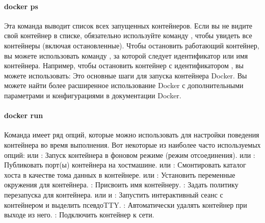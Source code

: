 \documentclass[letterpaper,10pt,russian]{sphinxmanual}
\begin{document}
\paragraph{docker ps}
\label{\detokenize{educational_materials/docker_base/content:docker-ps}}
\sphinxAtStartPar
Эта команда выводит список всех запущенных контейнеров. Если вы не видите свой контейнер в списке, обязательно используйте команду , чтобы увидеть все контейнеры (включая остановленные). Чтобы остановить работающий контейнер, вы можете использовать команду , за которой следует идентификатор или имя контейнера.
Например, чтобы остановить контейнер с идентификатором , вы можете использовать:
Это основные шаги для запуска контейнера Docker. Вы можете найти более расширенное использование Docker с дополнительными параметрами и конфигурациями в документации Docker.


\paragraph{docker run}
\label{\detokenize{educational_materials/docker_base/content:docker-run}}
\sphinxAtStartPar
Команда  имеет ряд опций, которые можно использовать для настройки поведения контейнера во время выполнения. Вот некоторые из наиболее часто используемых
опций:
 или : Запуск контейнера в фоновом режиме (режим отсоединения).
 или : Публиковать порт(ы) контейнера на хост\sphinxhyphen{}машине.
 или : Смонтировать каталог хоста в качестве тома данных в контейнере.
 или : Установить переменные окружения для контейнера.
: Присвоить имя контейнеру.
: Задать политику перезапуска для контейнера.
 или  и : Запустить интерактивный сеанс с контейнером и выделить
псевдо\sphinxhyphen{}TTY.
: Автоматически удалять контейнер при выходе из него.
: Подключить контейнер к сети.
\end{document}
